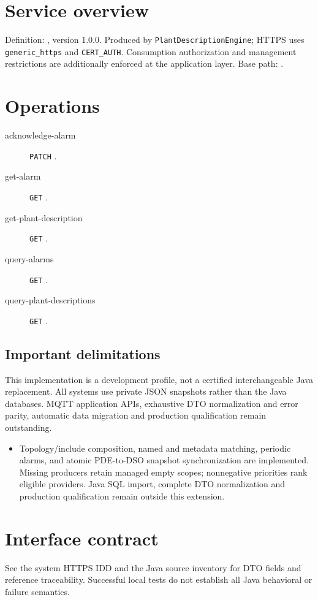 \documentclass[a4paper]{arrowhead}
\begin{document}
\ArrowheadSetup
\section{Service overview}
Definition: , version 1.0.0. Produced by \texttt{PlantDescriptionEngine}; HTTPS uses \texttt{generic\_https} and \texttt{CERT\_AUTH}. Consumption authorization and management restrictions are additionally enforced at the application layer. Base path: .
\section{Operations}
\begin{description}
\item[acknowledge-alarm] \texttt{PATCH} .
\item[get-alarm] \texttt{GET} .
\item[get-plant-description] \texttt{GET} .
\item[query-alarms] \texttt{GET} .
\item[query-plant-descriptions] \texttt{GET} .
\end{description}
\subsection{Important delimitations}
This implementation is a development profile, not a certified interchangeable Java replacement. All systems use private JSON snapshots rather than the Java databases. MQTT application APIs, exhaustive DTO normalization and error parity, automatic data migration and production qualification remain outstanding.
\begin{itemize}
\item Topology/include composition, named and metadata matching, periodic alarms, and atomic PDE-to-DSO snapshot synchronization are implemented. Missing producers retain managed empty scopes; nonnegative priorities rank eligible providers. Java SQL import, complete DTO normalization and production qualification remain outside this extension.
\end{itemize}
\section{Interface contract}
See the system HTTPS IDD and the Java source inventory for DTO fields and reference traceability. Successful local tests do not establish all Java behavioral or failure semantics.
\end{document}
